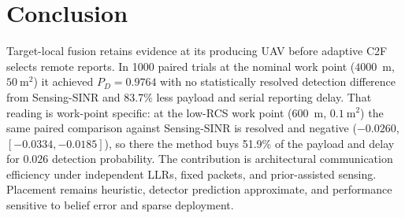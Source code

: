 \section{Conclusion}
\label{sec:conclusion}

Target-local fusion retains evidence at its producing UAV before adaptive C2F
selects remote reports. In 1000 paired trials at the nominal work point
($4000$~m, $50~\mathrm m^2$) it achieved $P_D=0.9764$ with
no statistically resolved detection difference from Sensing-SINR and 83.7\%
less payload and serial reporting delay. That reading is work-point specific:
at the low-RCS work point ($600$~m, $0.1~\mathrm m^2$) the same paired
comparison against Sensing-SINR is resolved and negative ($-0.0260$,
$[-0.0334,-0.0185]$), so there the method buys 51.9\% of the payload and delay
for $0.026$ detection probability. The contribution is architectural
communication efficiency under independent LLRs, fixed packets, and
prior-assisted sensing. Placement remains heuristic, detector prediction
approximate, and performance sensitive to belief error and sparse deployment.
